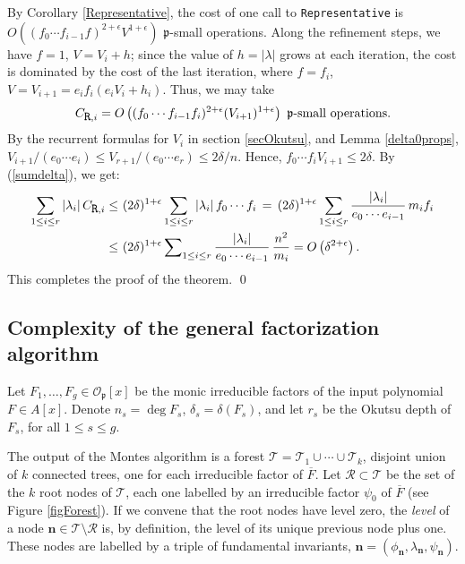 \documentclass{amsart}
\begin{document}
By Corollary \ref{Representative}, the cost of one call to {\tt Representative} is $O\left((f_0\cdots f_{i-1}f)^{2+\epsilon}V^{1+\epsilon}\right)$ ${\mathfrak{p}}$-small operations. Along the refinement steps, we have $f=1$, $V=V_i+h$; since the value of $h=|\lambda|$ grows at each iteration, the cost is dominated by the cost of the last iteration, where $f=f_i$, $V=V_{i+1}=e_if_i(e_iV_i+h_i)$. Thus, we may take 
$$
C_{\mbox{\tt R},i}=O\left((f_0\cdots f_{i-1}f_i)^{2+\epsilon}(V_{i+1})^{1+\epsilon}\right)\mbox{ ${\mathfrak{p}}$-small operations}.
$$
By the recurrent formulas for $V_i$ in section \ref{secOkutsu}, and Lemma \ref{delta0props}, $V_{i+1}/(e_0\cdots e_i)\le V_{r+1}/(e_0\cdots e_r)\le 2\delta/n$. Hence, $f_0\cdots f_iV_{i+1}\le 2\delta$.
By (\ref{sumdelta}), we get:
\begin{align*}
\sum_{1\le i\le r}|\lambda_i|\,C_{\mbox{\tt R},i}\le&\ (2\delta)^{1+\epsilon}\sum_{1\le i\le r}|\lambda_i|\,f_0\cdots f_i\,=\, (2\delta)^{1+\epsilon}\sum_{1\le i\le r}\dfrac{|\lambda_i|}{e_0\cdots e_{i-1}}\,m_if_i\\\le&\ (2\delta)^{1+\epsilon}\sum\nolimits_{1\le i\le r}\dfrac{|\lambda_i|}{e_0\cdots e_{i-1}}\,\dfrac{n^2}{m_i}=O\left(\delta^{2+\epsilon}\right).
\end{align*}
This completes the proof of the theorem.
\qed

\subsection{Complexity of the general factorization algorithm}\label{subsecGeneral}
\mbox{\null}\medskip

Let $F_1,\dots,F_g\in{\mathcal{O}}_{\mathfrak{p}}[x]$ be the monic irreducible factors of the input polynomial $F\in A[x]$. Denote $n_s=\deg F_s$, $\delta_s=\delta(F_s)$, and let $r_s$ be the Okutsu depth of $F_s$, for all $1\le s\le g$. 

The output of the Montes algorithm is a forest ${\mathcal{T}}={\mathcal{T}}_1\cup \cdots \cup {\mathcal{T}}_k$, disjoint union of $k$ connected trees, one for each irreducible factor of $\overline{F}$. 
Let ${\mathcal{R}}\subset{\mathcal{T}}$ be the set of the $k$ root nodes of ${\mathcal{T}}$, each one labelled by an irreducible factor $\psi_{0}$ of $\overline{F}$ (see Figure \ref{figForest}). If we convene that the root nodes have level zero, the \emph{level} of a node ${\mathbf{n}}\in{\mathcal{T}}\setminus{\mathcal{R}}$ is, by definition, the level of its unique previous node plus one. These nodes are labelled by a triple of fundamental invariants, ${\mathbf{n}}=(\phi_{\mathbf{n}},\lambda_{\mathbf{n}},\psi_{\mathbf{n}})$. \bigskip
\end{document}
